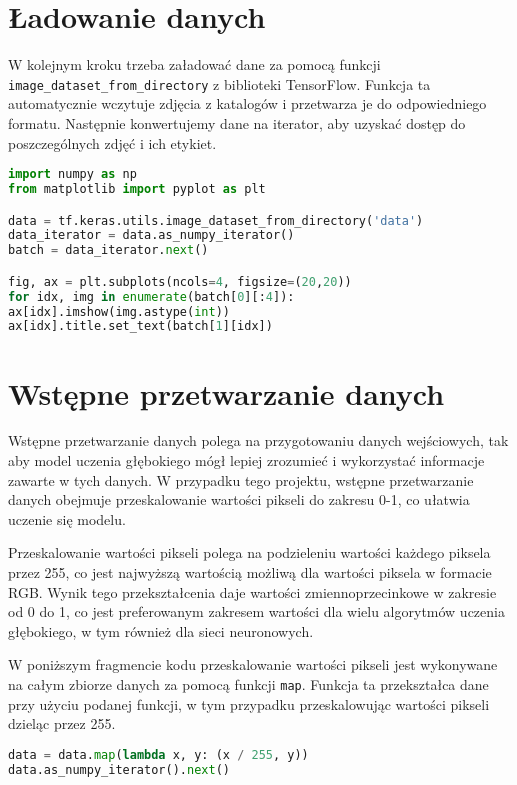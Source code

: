\section{Ładowanie danych}
W kolejnym kroku trzeba załadować dane za pomocą funkcji \texttt{image\_dataset\_from\_directory} z biblioteki TensorFlow. Funkcja ta automatycznie wczytuje zdjęcia z katalogów i przetwarza je do odpowiedniego formatu. Następnie konwertujemy dane na iterator, aby uzyskać dostęp do poszczególnych zdjęć i ich etykiet.

\begin{lstlisting}[language=Python]
import numpy as np
from matplotlib import pyplot as plt

data = tf.keras.utils.image_dataset_from_directory('data')
data_iterator = data.as_numpy_iterator()
batch = data_iterator.next()

fig, ax = plt.subplots(ncols=4, figsize=(20,20))
for idx, img in enumerate(batch[0][:4]):
ax[idx].imshow(img.astype(int))
ax[idx].title.set_text(batch[1][idx])
\end{lstlisting}

\section{Wstępne przetwarzanie danych}
Wstępne przetwarzanie danych polega na przygotowaniu danych wejściowych, tak aby model uczenia głębokiego mógł lepiej zrozumieć i wykorzystać informacje zawarte w tych danych. W przypadku tego projektu, wstępne przetwarzanie danych obejmuje przeskalowanie wartości pikseli do zakresu 0-1, co ułatwia uczenie się modelu.

Przeskalowanie wartości pikseli polega na podzieleniu wartości każdego piksela przez 255, co jest najwyższą wartością możliwą dla wartości piksela w formacie RGB. Wynik tego przekształcenia daje wartości zmiennoprzecinkowe w zakresie od 0 do 1, co jest preferowanym zakresem wartości dla wielu algorytmów uczenia głębokiego, w tym również dla sieci neuronowych.

W poniższym fragmencie kodu przeskalowanie wartości pikseli jest wykonywane na całym zbiorze danych za pomocą funkcji \texttt{map}. Funkcja ta przekształca dane przy użyciu podanej funkcji, w tym przypadku przeskalowując wartości pikseli dzieląc przez 255.

\begin{lstlisting}[language=Python]
data = data.map(lambda x, y: (x / 255, y))
data.as_numpy_iterator().next()
\end{lstlisting}

